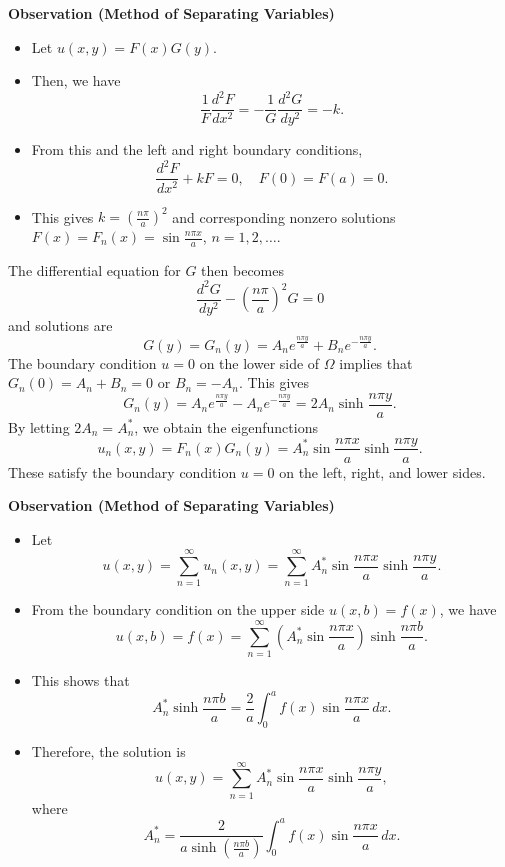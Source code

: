 \documentclass[12pt,openany]{book}
\theoremstyle{definition}
\begin{document}
	\textbf{Observation (Method of Separating Variables)}
	\begin{itemize}
		\item Let \( u(x, y) = F(x)G(y) \).
		\item Then, we have
		\[
		\frac{1}{F} \frac{d^2 F}{dx^2} = -\frac{1}{G} \frac{d^2 G}{dy^2} = -k.
		\]
		\item From this and the left and right boundary conditions,
		\[
		\frac{d^2 F}{dx^2} + kF = 0, \quad F(0) = F(a) = 0.
		\]
		\item This gives \( k = \left( \frac{n\pi}{a} \right)^2 \) and corresponding nonzero solutions \( F(x) = F_n(x) = \sin \frac{n\pi x}{a} \), \( n = 1,2,\ldots \).
	\end{itemize}
	
	The differential equation for \( G \) then becomes
	\[
	\frac{d^2 G}{dy^2} - \left( \frac{n\pi}{a} \right)^2 G = 0
	\]
	and solutions are
	\[
	G(y) = G_n(y) = A_n e^{\frac{n\pi y}{a}} + B_n e^{-\frac{n\pi y}{a}}.
	\]
	The boundary condition \( u = 0 \) on the lower side of \( \Omega \) implies that \( G_n(0) = A_n + B_n = 0 \) or \( B_n = -A_n \). This gives
	\[
	G_n(y) = A_n e^{\frac{n\pi y}{a}} - A_n e^{-\frac{n\pi y}{a}} = 2A_n \sinh \frac{n\pi y}{a}.
	\]
	By letting \( 2A_n = A_n^* \), we obtain the eigenfunctions
	\[
	u_n(x, y) = F_n(x)G_n(y) = A_n^* \sin \frac{n\pi x}{a} \sinh \frac{n\pi y}{a}.
	\]
	These satisfy the boundary condition \( u = 0 \) on the left, right, and lower sides.
	
	
	\textbf{Observation (Method of Separating Variables)}
	
	\begin{itemize}
		\item Let
		\[
		u(x, y) = \sum_{n=1}^{\infty} u_n(x, y) = \sum_{n=1}^{\infty} A_n^* \sin \frac{n\pi x}{a} \sinh \frac{n\pi y}{a}.
		\]
		
		\item From the boundary condition on the upper side \( u(x, b) = f(x) \), we have
		\[
		u(x, b) = f(x) = \sum_{n=1}^{\infty} \left( A_n^* \sin \frac{n\pi x}{a} \right) \sinh \frac{n\pi b}{a}.
		\]
		
		\item This shows that
		\[
		A_n^* \sinh \frac{n\pi b}{a} = \frac{2}{a} \int_{0}^{a} f(x) \sin \frac{n\pi x}{a} \, dx.
		\]
		
		\item Therefore, the solution is
		\[
		u(x, y) = \sum_{n=1}^{\infty} A_n^* \sin \frac{n\pi x}{a} \sinh \frac{n\pi y}{a},
		\]
		where
		\[
		A_n^* = \frac{2}{a \sinh \left( \frac{n\pi b}{a} \right)} \int_{0}^{a} f(x) \sin \frac{n\pi x}{a} \, dx.
		\]
	\end{itemize}
	
\end{document}
